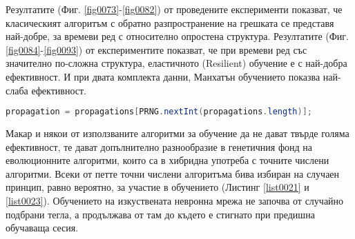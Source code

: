 Резултатите (Фиг. \ref{fig0073}-\ref{fig0082}) от проведените експерименти показват, че класическият алгоритъм с обратно разпространение на грешката се представя най-добре, за времеви ред с относително опростена структура. Резултатите (Фиг. \ref{fig0084}-\ref{fig0093}) от експериментите показват, че при времеви ред със значително по-сложна структура, еластичното (Resilient) обучение е с най-добра ефективност. И при двата комплекта данни, Манхатън обучението показва най-слаба ефективност. 

\begin{lstlisting}[caption=Случаен избор на точните числени методи, language=Java, basicstyle=\tiny, label=list0023]
propagation = propagations[PRNG.nextInt(propagations.length)];
\end{lstlisting}

Макар и някои от използваните алгоритми за обучение да не дават твърде голяма ефективност, те дават допълнително разнообразие в генетичния фонд на еволюционните алгоритми, които са в хибридна употреба с точните числени алгоритми. Всеки от петте точни числени алгоритъма бива избиран на случаен принцип, равно вероятно, за участие в обучението (Листинг \ref{list0021} и \ref{list0023}). Обучението на изкуствената невронна мрежа не започва от случайно подбрани тегла, а продължава от там до където е стигнато при предишна обучаваща сесия. 

